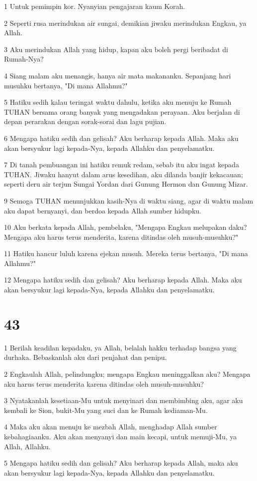 \par 1 Untuk pemimpin kor. Nyanyian pengajaran kaum Korah.
\par 2 Seperti rusa merindukan air sungai, demikian jiwaku merindukan Engkau, ya Allah.
\par 3 Aku merindukan Allah yang hidup, kapan aku boleh pergi beribadat di Rumah-Nya?
\par 4 Siang malam aku menangis, hanya air mata makananku. Sepanjang hari musuhku bertanya, "Di mana Allahmu?"
\par 5 Hatiku sedih kalau teringat waktu dahulu, ketika aku menuju ke Rumah TUHAN bersama orang banyak yang mengadakan perayaan. Aku berjalan di depan perarakan dengan sorak-sorai dan lagu pujian.
\par 6 Mengapa hatiku sedih dan gelisah? Aku berharap kepada Allah. Maka aku akan bersyukur lagi kepada-Nya, kepada Allahku dan penyelamatku.
\par 7 Di tanah pembuangan ini hatiku remuk redam, sebab itu aku ingat kepada TUHAN. Jiwaku hanyut dalam arus kesedihan, aku dilanda banjir kekacauan; seperti deru air terjun Sungai Yordan dari Gunung Hermon dan Gunung Mizar.
\par 9 Semoga TUHAN menunjukkan kasih-Nya di waktu siang, agar di waktu malam aku dapat bernyanyi, dan berdoa kepada Allah sumber hidupku.
\par 10 Aku berkata kepada Allah, pembelaku, "Mengapa Engkau melupakan daku? Mengapa aku harus terus menderita, karena ditindas oleh musuh-musuhku?"
\par 11 Hatiku hancur luluh karena ejekan musuh. Mereka terus bertanya, "Di mana Allahmu?"
\par 12 Mengapa hatiku sedih dan gelisah? Aku berharap kepada Allah. Maka aku akan bersyukur lagi kepada-Nya, kepada Allahku dan penyelamatku.

\chapter{43}

\par 1 Berilah keadilan kepadaku, ya Allah, belalah hakku terhadap bangsa yang durhaka. Bebaskanlah aku dari penjahat dan penipu.
\par 2 Engkaulah Allah, pelindungku; mengapa Engkau meninggalkan aku? Mengapa aku harus terus menderita karena ditindas oleh musuh-musuhku?
\par 3 Nyatakanlah kesetiaan-Mu untuk menyinari dan membimbing aku, agar aku kembali ke Sion, bukit-Mu yang suci dan ke Rumah kediaman-Mu.
\par 4 Maka aku akan menuju ke mezbah Allah, menghadap Allah sumber kebahagiaanku. Aku akan menyanyi dan main kecapi, untuk memuji-Mu, ya Allah, Allahku.
\par 5 Mengapa hatiku sedih dan gelisah? Aku berharap kepada Allah, maka aku akan bersyukur lagi kepada-Nya, kepada Allahku dan penyelamatku.


